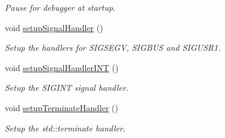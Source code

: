 \begin{DoxyCompactItemize}
\begin{DoxyCompactList}\small\item\em Pause for debugger at startup. \end{DoxyCompactList}\item 
void \hyperlink{structvt_1_1runtime_1_1_runtime_af87ef11218f0c1d095dcdcd4cfe4521e}{setup\+Signal\+Handler} ()
\begin{DoxyCompactList}\small\item\em Setup the handlers for S\+I\+G\+S\+E\+GV, S\+I\+G\+B\+US and S\+I\+G\+U\+S\+R1. \end{DoxyCompactList}\item 
void \hyperlink{structvt_1_1runtime_1_1_runtime_a382e68597ae7acb16bdb9f1c3ab4f010}{setup\+Signal\+Handler\+I\+NT} ()
\begin{DoxyCompactList}\small\item\em Setup the S\+I\+G\+I\+NT signal handler. \end{DoxyCompactList}\item 
void \hyperlink{structvt_1_1runtime_1_1_runtime_ad66c903b37209c7499ebdf53efb5f9b3}{setup\+Terminate\+Handler} ()
\begin{DoxyCompactList}\small\item\em Setup the std\+::terminate handler. \end{DoxyCompactList}\end{DoxyCompactItemize}

